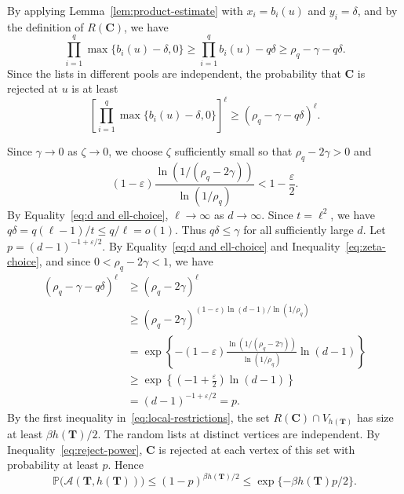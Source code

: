 \documentclass[12pt]{article}
\numberwithin{equation}{section}
\theoremstyle{definition}
\newcommand{\Prob}{\mathbb{P}}
\begin{document}
By applying Lemma~\ref{lem:product-estimate} with $x_i=b_i(u)$ and
$y_i=\delta$, and by the definition of $R(\mathbf{C})$, we have
\[
 \prod_{i = 1}^q \max\{b_i(u) - \delta,0\}
 \geq \prod_{i = 1}^q b_i(u) - q\delta
 \geq \rho_q - \gamma - q\delta.
\]
Since the lists in different pools are independent, the probability that
$\mathbf{C}$ is rejected at $u$ is at least
\[
 \left[\prod_{i = 1}^q
 \max\{b_i(u) - \delta,0\}\right]^{\ell}
 \geq (\rho_q - \gamma - q\delta)^{\ell}.
\]

Since $\gamma\to0$ as $\zeta\to0$, we choose $\zeta$ sufficiently small so that $\rho_q - 2\gamma > 0$ and
\begin{equation}\label{eq:zeta-choice}
 (1 - \varepsilon)
 \frac{\ln(1/(\rho_q - 2\gamma))}{\ln(1/\rho_q)}
 < 1 - \frac{\varepsilon}{2}.
\end{equation}
By Equality~\eqref{eq:d and ell-choice}, $\ell \to \infty$ as $d \to \infty$. Since
$t = \ell^2$, we have
$q\delta = q(\ell - 1)/t \leq q/\ell = o(1)$. Thus $q\delta \leq \gamma$ for all
sufficiently large $d$. Let $p=(d-1)^{-1+\varepsilon/2}$.
By Equality~\eqref{eq:d and ell-choice} and
Inequality~\eqref{eq:zeta-choice}, and since
$0 < \rho_q - 2\gamma < 1$, we have
\begin{equation}\label{eq:reject-power}
 \begin{aligned}
 (\rho_q - \gamma - q\delta)^{\ell}
 & \geq (\rho_q - 2\gamma)^{\ell}\\
 & \geq (\rho_q - 2\gamma)^{
 (1 - \varepsilon)\ln(d - 1)/\ln(1/\rho_q)}\\
 &= \exp\left\{-(1 - \varepsilon)
 \frac{\ln(1/(\rho_q - 2\gamma))}{\ln(1/\rho_q)}
 \ln(d - 1)\right\}\\
 & \geq \exp\left\{\left(-1 + \frac{\varepsilon}{2}\right)
 \ln(d - 1)\right\}\\
 &= (d-1)^{-1+\varepsilon/2} = p.
 \end{aligned}
\end{equation}
By the first inequality in~\eqref{eq:local-restrictions}, the set
$R(\mathbf{C})\cap V_{h(\mathbf T)}$ has size at least
$\beta h(\mathbf T)/2$. The random lists at
distinct vertices are independent. By Inequality~\eqref{eq:reject-power},
$\mathbf{C}$ is rejected at each vertex of this set with probability at least
$p$. Hence
\begin{equation}\label{eq:tuple-survive}
 \Prob\bigl(\mathcal A(\mathbf T,h(\mathbf T))\bigr)
 \leq (1 - p)^{\beta h(\mathbf T)/2}
 \leq \exp\{-\beta h(\mathbf T)p/2\}.
\end{equation}
\end{document}
